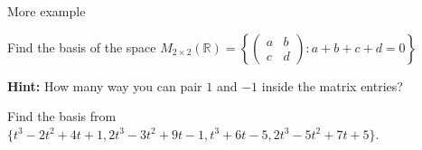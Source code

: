 \documentclass[11pt]{beamer}
\theoremstyle{plain}
\begin{document}
\begin{frame}{More example}
    \begin{example}
        Find the basis of the space $M_{2\times 2}(\mathbb R)=\left\{\begin{pmatrix}
            a&b\\c&d
        \end{pmatrix}:a+b+c+d=0\right\}$
    \end{example}
    \textbf{Hint:} How many way you can pair $1$ and $-1$ inside the matrix entries?
    \begin{example}
        Find the basis from $\{t^3-2t^2+4t+1,2t^3-3t^2+9t-1,t^3+6t-5,2t^3-5t^2+7t+5\}$.
    \end{example}
\end{frame}
\end{document}
